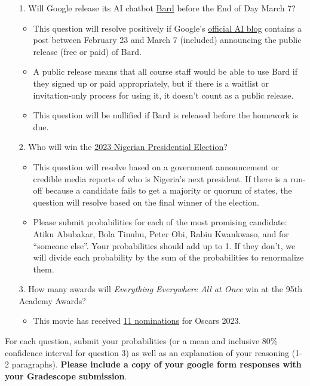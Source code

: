 \documentclass[11pt]{article}
\begin{document}
\begin{enumerate}
	\item[1.] Will Google release its AI chatbot \href{https://blog.google/technology/ai/bard-google-ai-search-updates/}{Bard} before the End of Day March 7?
	\begin{itemize}
		\item This question will resolve positively if Google's \href{https://blog.google/technology/ai/}{official AI blog} contains a post between February 23 and March 7 (included) announcing the public release (free or paid) of Bard. 
        \item A public release means that all course staff would be able to use Bard if they signed up or paid appropriately, but if there is a waitlist or invitation-only process for using it, it doesn't count as a public release. 
        \item This question will be nullified if Bard is released before the homework is due.
	\end{itemize} 
	\item[2.] Who will win the \href{https://www.bbc.com/news/world-africa-64496042}{2023 Nigerian Presidential Election}?
	\begin{itemize}
		\item This question will resolve based on a government announcement or credible media reports of who is Nigeria's next president. If there is a run-off because a candidate fails to get a majority or quorum of states, the question will resolve based on the final winner of the election. 
        \item Please submit probabilities for each of the most promising candidate: Atiku Abubakar, Bola Tinubu, Peter Obi, Rabiu Kwankwaso, and for ``someone else''. Your probabilities should add up to 1. If they don't, we will divide each probability by the sum of the probabilities to renormalize them.
    \end{itemize}

	\item[3.] How many awards will \emph{Everything Everywhere All at Once} win at the 95th Academy Awards?
	\begin{itemize}
		\item This movie has received \href{https://www.imdb.com/title/tt6710474/awards/}{11 nominations} for Oscars 2023.  
	\end{itemize} 
\end{enumerate}

For each question, submit your probabilities (or a mean and inclusive 80\% confidence interval for question 3) as well as an explanation of your reasoning (1-2 paragraphs). \textbf{Please include a copy of your google form responses with your Gradescope submission}. 
\end{document}
